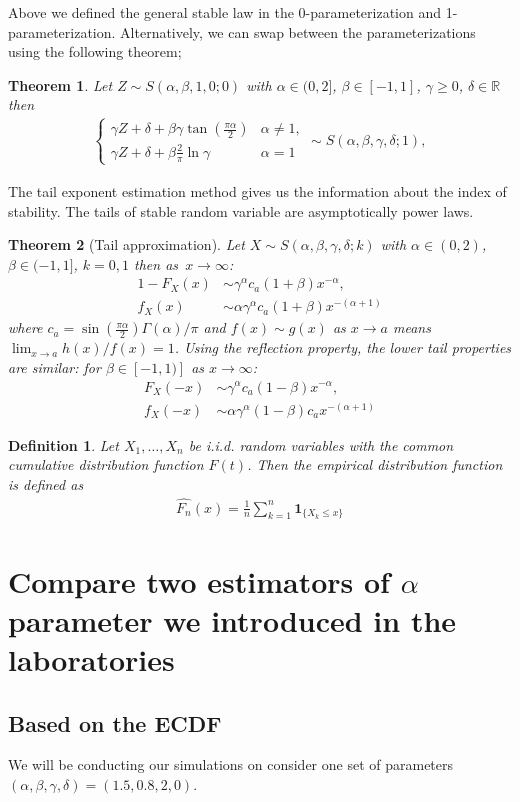 \documentclass{article}
\newtheorem{theorem}{Theorem}
\newtheorem{definition}{Definition}
\begin{document}
		Above we defined the general stable law in the 0-parameterization and 1-parameterization.
		Alternatively, we can swap between the parameterizations using the following theorem;
		\begin{theorem}Let $Z\sim S(\alpha,\beta,1,0;0)$  with $\alpha \in (0,2]$, $\beta \in [-1,1]$, $\gamma \ge 0$, $\delta\in\mathbb{R}$ then  
			\begin{gather*}
				\begin{cases}
					\gamma Z + \delta + \beta \gamma \tan\left(\frac{\pi\alpha}{2}\right) &\alpha\ne1,\\
					\gamma Z + \delta + \beta \frac{2}{\pi}\ln\gamma  &\alpha=1
				\end{cases}\sim S(\alpha,\beta,\gamma,\delta; 1),
			\end{gather*}
		\end{theorem}

		The tail exponent estimation method gives us the information
		about the index of stability. The tails of stable random variable are asymptotically power laws. 
		\begin{theorem}[Tail approximation] Let $X \sim S(\alpha, \beta , \gamma, \delta; k)$ with $\alpha \in (0,2)$, $\beta \in (-1,1]$, $k=0,1$ then as~$x\to \infty$:
			\begin{align*}
				1 - F_X(x) &\sim \gamma^\alpha c_a (1+\beta)x^{-\alpha},\\
				f_X(x) &\sim \alpha \gamma^\alpha c_a (1+\beta) x^{-(\alpha + 1)}
			\end{align*}
			where $c_a = \sin(\frac{\pi\alpha}{2})\Gamma(\alpha)/\pi$ and $f(x)\sim g(x)$ as $x\to a$ means $\lim_{x\to a} h(x)/f(x) = 1$. Using the reflection property, the lower tail properties are
			similar: for $\beta\in[-1,1)]$ as $x \to \infty$:
			\begin{align*}
				F_X(-x) &\sim  \gamma^\alpha c_a (1-\beta)x^{-\alpha},\\
				f_X(-x) &\sim  \alpha \gamma^\alpha (1-\beta)c_a x^{-(\alpha + 1)}
			\end{align*}
		\end{theorem}
		
		\begin{definition}Let $X_1,\dots, X_n$ be i.i.d. random variables with the common cumulative distribution function $F(t)$. 
			Then the empirical distribution function is defined as
			\begin{gather*}
				\hat{F_n}(x) = \frac{1}{n}\sum_{k = 1}^{n}\mathbf{1}_{\{X_k \le x\}}
			\end{gather*}
		\end{definition}
		
		\section{Compare two estimators of $\alpha$ parameter we introduced in the laboratories}
		\subsection{Based on the ECDF}
		We will be conducting our simulations on consider one set of parameters $(\alpha, \beta , \gamma, \delta) = (1.5, 0.8, 2, 0)$.
\end{document}
